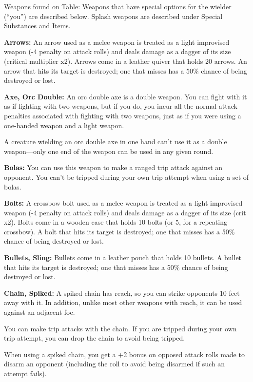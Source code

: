\documentclass{article}
\begin{document}
\vspace{12pt}
Weapons found on Table: Weapons that have special options for the wielder (``you'') 
are described below. Splash weapons are described under Special Substances and 
Items.

\textbf{Arrows:} An arrow used as a melee weapon is treated as a light improvised 
weapon (-4 penalty on attack rolls) and deals damage as a dagger of its size (critical 
multiplier x2). Arrows come in a leather quiver that holds 20 arrows. An arrow 
that hits its target is destroyed; one that misses has a 50\% chance of being destroyed 
or lost.

\textbf{Axe, Orc Double:} An orc double axe is a double weapon. You can fight with 
it as if fighting with two weapons, but if you do, you incur all the normal attack 
penalties associated with fighting with two weapons, just as if you were using 
a one-handed weapon and a light weapon.

A creature wielding an orc double axe in one hand can't use it as a double weapon---only 
one end of the weapon can be used in any given round.

\textbf{Bolas:} You can use this weapon to make a ranged trip attack against an 
opponent. You can't be tripped during your own trip attempt when using a set of 
bolas.

\textbf{Bolts:} A crossbow bolt used as a melee weapon is treated as a light improvised 
weapon (-4 penalty on attack rolls) and deals damage as a dagger of its size (crit 
x2). Bolts come in a wooden case that holds 10 bolts (or 5, for a repeating crossbow). 
A bolt that hits its target is destroyed; one that misses has a 50\% chance of 
being destroyed or lost.

\textbf{Bullets, Sling:} Bullets come in a leather pouch that holds 10 bullets. 
A bullet that hits its target is destroyed; one that misses has a 50\% chance of 
being destroyed or lost.

\textbf{Chain, Spiked:} A spiked chain has reach, so you can strike opponents 10 
feet away with it. In addition, unlike most other weapons with reach, it can be 
used against an adjacent foe.

You can make trip attacks with the chain. If you are tripped during your own trip 
attempt, you can drop the chain to avoid being tripped.

When using a spiked chain, you get a +2 bonus on opposed attack rolls made to disarm 
an opponent (including the roll to avoid being disarmed if such an attempt fails).
\end{document}
